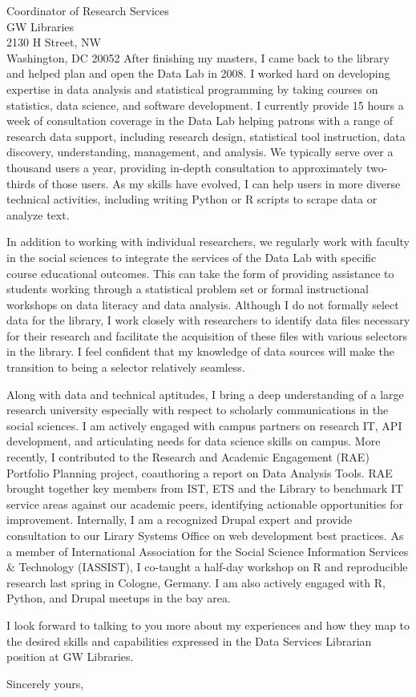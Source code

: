 \documentclass[11pt]{letter} %
\begin{document}
\begin{letter}{Coordinator of Research Services \\
GW Libraries\\
2130 H Street, NW\\
Washington, DC 20052 }
After finishing my masters, I came back to the library and helped plan and open the Data Lab in 2008. I worked hard on developing expertise in data analysis and statistical programming by taking courses on statistics, data science, and software development. I currently provide 15 hours a week of consultation coverage in the Data Lab helping patrons with a range of research data support, including research design, statistical tool instruction, data discovery, understanding, management, and analysis. We typically serve over a thousand users a year, providing in-depth consultation to approximately two-thirds of those users. As my skills have evolved, I can help users in more diverse technical activities, including writing Python or R scripts to scrape data or analyze text.

In addition to working with individual researchers, we regularly work with faculty in the social sciences to integrate the services of the Data Lab with specific course educational outcomes. This can take the form of providing assistance to students working through a statistical problem set or formal instructional workshops on data literacy and data analysis. Although I do not formally select data for the library, I work closely with researchers to identify data files necessary for their research and facilitate the acquisition of these files with various selectors in the library. I feel confident that my knowledge of data sources will make the transition to being a selector relatively seamless.

Along with data and technical aptitudes, I bring a deep understanding of a large research university especially with respect to scholarly communications in the social sciences. I am actively engaged with campus partners on research IT, API development, and articulating needs for data science skills on campus. More recently, I contributed to the Research and Academic Engagement (RAE) Portfolio Planning project, co­authoring a report on Data Analysis Tools. RAE brought together key members from IST, ETS and the Library to benchmark IT service areas against our academic peers, identifying actionable opportunities for improvement. Internally, I am a recognized Drupal expert and provide consultation to our Lirary Systems Office on web development best practices. As a member of International Association for the Social Science Information Services \& Technology (IASSIST), I co-taught a half-day workshop on R and reproducible research last spring in Cologne, Germany. I am also actively engaged with R, Python, and Drupal meetups in the bay area.

I look forward to talking to you more about my experiences and how they map to the desired skills and capabilities expressed in the Data Services Librarian position at GW Libraries.

\closing{Sincerely yours,}




\end{letter}
\end{document}
